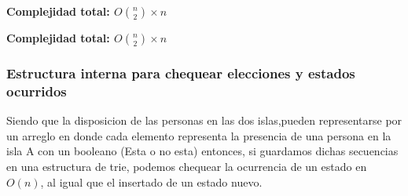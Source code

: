 \begin{algorithm}[H]
\textbf{\hfill Complejidad total: $O\binom{n}{2} \times n$}\\ 
\end{algorithm}

\begin{algorithm}[H]
\textbf{\hfill Complejidad total: $O\binom{n}{2} \times n$}\\ 
\end{algorithm}


\subsubsection{Estructura interna para chequear elecciones y estados ocurridos}

Siendo que la disposicion de las personas en las dos islas,pueden representarse por un arreglo en donde cada elemento representa la presencia de una persona en la isla A con un booleano (Esta o no esta) entonces, si guardamos dichas secuencias en una estructura de trie, podemos chequear la ocurrencia de un estado en $O(n)$, al igual que el insertado de un estado nuevo.\\

